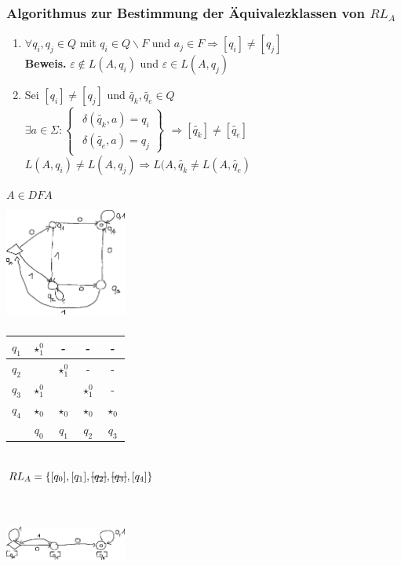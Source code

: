 \documentclass[a4paper,10pt,landscape,twocolumn]{article}
\newcommand{\Bold}[1]{\textbf{#1}} %
\newcommand{\T}[1]{\text{#1}} %
\newcommand{\Nicht}[1]{\T{\sout{$ #1 $}}} %
\newcommand{\Ra}{\Rightarrow}
\newcommand{\Brackal}[2]{\left\lbrace\begin{array}{#1} #2 \end{array}\right.} %
\newcommand{\Brackar}[2]{\left.\begin{array}{#1} #2 \end{array}\right\rbrace} %
\begin{document}
\subsubsection{Algorithmus zur Bestimmung der \"Aquivalezklassen von $RL_A$}
\begin{enumerate}
 \item $\forall q_i,q_j\in Q$ mit $q_i\in Q\backslash F$ und $a_j\in F\Ra [q_i]\neq [q_j]$\\
 \Bold{Beweis.} $\varepsilon\notin L(A,q_i)$ und $\varepsilon\in L(A,q_j)$
 \item Sei $[q_i]\neq[q_j]$ und $\tilde{q_k},\tilde{q_e}\in Q$\\
 $\exists a\in\Sigma:\Brackal{l}{\Brackar{l}{\delta(\tilde{q_k},a)=q_i\\\delta(\tilde{q_e},a)=q_j}}\Ra[\tilde{q_k}]\neq[\tilde{q_e}]$\\
 $L(A,q_i)\neq L(A,q_j)\Ra L(A,\tilde{q_k}\neq L(A,\tilde{q_e})$
\end{enumerate}
$A\in DFA$\\
\includegraphics[width=0.3\textwidth,height=4cm,keepaspectratio]{Bild18.eps}\\
\begin{tabular}{c|c|c|c|c|}
 \hline $q_1$&$\star_1^0$&-&-&-\\\hline
 $q_2$&&$\star_1^0$&-&-\\\hline
 $q_3$&$\star_1^0$&&$\star_1^0$&-\\\hline
 $q_4$&$\star_0$&$\star_0$&$\star_0$&$\star_0$\\\hline
 &$q_0$&$q_1$&$q_2$&$q_3$
\end{tabular}\\
$RL_A=\{[q_0],[q_1],\Nicht{[q_2]},\Nicht{[q_3]},[q_4]\}$\\
\includegraphics[width=0.3\textwidth,height=4cm,keepaspectratio]{Bild19.eps}\\
\end{document}
